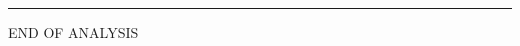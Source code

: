 \documentclass[twocolumn,10pt]{article}
\begin{document}


\noindent\rule{\linewidth}{1pt} END OF ANALYSIS
\end{document}

